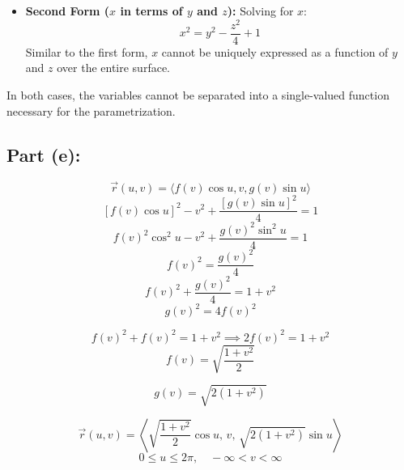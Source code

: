 \documentclass{report}
\begin{document}
{\begin{itemize}
    \item \textbf{Second Form (\( x \) in terms of \( y \) and \( z \)):} Solving for \( x \):
    \[
    x^2 = y^2 - \frac{z^2}{4} + 1
    \]
    Similar to the first form, \( x \) cannot be uniquely expressed as a function of \( y \) and \( z \) over the entire surface.
\end{itemize}

In both cases, the variables cannot be separated into a single-valued function necessary for the parametrization.

\subsection*{Part (e):}
    \[ \vec{r}(u, v) = \langle f(v) \cos u, v, g(v) \sin u \rangle \]
    \[ \left[ f(v) \cos u \right]^2 - v^2 + \frac{\left[ g(v) \sin u \right]^2}{4} = 1 \]
    \[ f(v)^2 \cos^2 u - v^2 + \frac{g(v)^2 \sin^2 u}{4} = 1 \]
    \[ f(v)^2 = \frac{g(v)^2}{4} \]
    \[ f(v)^2 + \frac{g(v)^2}{4} = 1 + v^2 \]
    \[ g(v)^2 = 4 f(v)^2 \]

    \[ f(v)^2 + f(v)^2 = 1 + v^2 \implies 2 f(v)^2 = 1 + v^2 \]
    \[ f(v) = \sqrt{\frac{1 + v^2}{2}} \]

    \[ g(v) = \sqrt{2(1 + v^2)} \]

    \[ \vec{r}(u, v) = \left\langle \sqrt{\frac{1 + v^2}{2}} \cos u, \, v, \, \sqrt{2(1 + v^2)} \sin u \right\rangle \]
    \[ 0 \leq u \leq 2\pi, \quad -\infty < v < \infty \]
}

\newpage


\end{document}
